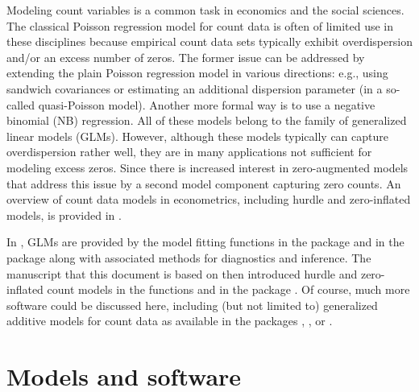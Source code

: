 \documentclass[article]{jss}
\newcommand{\fct}[1]{\code{#1()}}
\begin{document}
Modeling count variables is a common task in economics and the social sciences.
The classical Poisson regression model for count data is often of limited use in
these disciplines because empirical count data sets typically exhibit
overdispersion and/or an excess number of zeros. The former issue can be
addressed by extending  the plain Poisson regression model in various
directions: e.g., using sandwich covariances or estimating an additional
dispersion parameter (in a so-called quasi-Poisson model). Another more formal
way is to use a negative binomial (NB) regression. All of these models belong to
the family of generalized linear models (GLMs). However, although these models
typically can capture overdispersion rather well, they are in many applications
not sufficient for  modeling excess zeros. Since \cite{Mullahy:1986} there is
increased interest in zero-augmented models that address this issue by a second
model component capturing zero counts. An overview of count data models in
econometrics, including  hurdle and zero-inflated models, is provided in
\cite{Cameron+Trivedi:2013}.

In  \citep{R}, GLMs are provided by the model fitting functions
\fct{glm} in the  package and \fct{glm.nb} in the  package
\citep[][Chapter~7.4]{Venables+Ripley:2002} along with associated methods for
diagnostics and inference. The manuscript that this document is based on
\citep{Zeileis+Kleiber+Jackman:2008} then introduced hurdle and zero-inflated
count models in the functions \fct{hurdle} and \fct{zeroinfl} in the 
package \citep{Jackman:2015}. Of course, much more software could be discussed
here, including (but not limited to) generalized additive models for count data
as available in the  packages  \cite{Wood:2006},
 \citep{Stasinopoulos+Rigby:2007}, or  \citep{Yee:2009}.




\section{Models and software} \label{sec:models}
\end{document}
